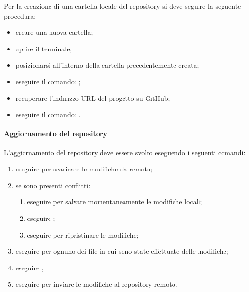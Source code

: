 	  Per la creazione di una cartella locale del repository si deve seguire la seguente procedura:
	  \begin{itemize}
	  	\item creare una nuova cartella;
	  	\item aprire il terminale;
	  	\item posizionarsi all'interno della cartella precedentemente creata;
	  	\item eseguire il comando: ;
	  	\item recuperare l'indirizzo URL del progetto su GitHub;
	  	\item eseguire il comando: .
	  \end{itemize}
	  \paragraph{Aggiornamento del repository} \label{sec:commit}
	  L'aggiornamento del repository deve essere svolto eseguendo i seguenti comandi:
	  \begin{enumerate}
	  	\item eseguire  per scaricare le modifiche da remoto;
	  	\item se sono presenti conflitti:
	  	\begin{enumerate}
	  		\item eseguire  per salvare momentaneamente le modifiche locali;
	  		\item eseguire ;
	  		\item eseguire  per ripristinare le modifiche;
	  	\end{enumerate}
	  	\item eseguire  per ognuno dei file in cui sono state effettuate delle modifiche;
	  	\item eseguire ;
	  	\item eseguire  per inviare le modifiche al repository remoto.
	  \end{enumerate}

